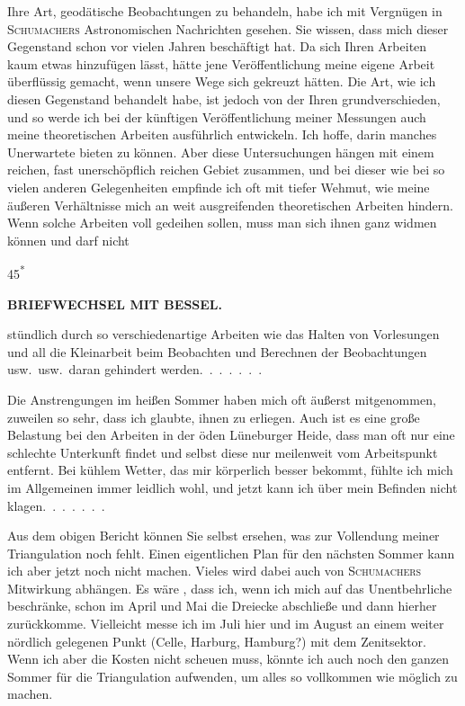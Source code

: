 \par\noindent\hspace*{\parindent}Ihre Art, geodätische Beobachtungen zu behandeln, habe ich mit Vergnügen in \textsc{Schumachers} Astronomischen Nachrichten gesehen.
Sie wissen, dass mich dieser Gegenstand schon vor vielen Jahren beschäftigt hat.
Da sich Ihren Arbeiten kaum etwas hinzufügen lässt, hätte jene Veröffentlichung meine eigene Arbeit überflüssig gemacht, wenn unsere Wege sich gekreuzt hätten.
Die Art, wie ich diesen Gegenstand behandelt habe, ist jedoch von der Ihren grundverschieden, und so werde ich bei der künftigen Veröffentlichung meiner Messungen auch meine theoretischen Arbeiten ausführlich entwickeln.
Ich hoffe, darin manches Unerwartete bieten zu können.
Aber diese Untersuchungen hängen mit einem reichen, fast unerschöpflich reichen Gebiet zusammen, und bei dieser wie bei so vielen anderen Gelegenheiten empfinde ich oft mit tiefer Wehmut, wie meine äußeren Verhältnisse mich an weit ausgreifenden theoretischen Arbeiten hindern.
Wenn solche Arbeiten voll gedeihen sollen, muss man sich ihnen ganz widmen können und darf nicht
\par\smallskip\noindent\hfill{\footnotesize45\textsuperscript{*}}\par
\clearpage
{}\hfill{\small\textbf{BRIEFWECHSEL MIT BESSEL.}}\par\medskip
\noindent stündlich durch so verschiedenartige Arbeiten wie das Halten von Vorlesungen und all die Kleinarbeit beim Beobachten und Berechnen der Beobachtungen usw.\ usw.\ daran gehindert werden.\ .\ .\ .\ .\ .\ .

\par\noindent\hspace*{\parindent}Die Anstrengungen im heißen Sommer haben mich oft äußerst mitgenommen, zuweilen so sehr, dass ich glaubte, ihnen zu erliegen.
Auch ist es eine große Belastung bei den Arbeiten in der öden Lüneburger Heide, dass man oft nur eine schlechte Unterkunft findet und selbst diese nur meilenweit vom Arbeitspunkt entfernt.
Bei kühlem Wetter, das mir körperlich besser bekommt, fühlte ich mich im Allgemeinen immer leidlich wohl, und jetzt kann ich über mein Befinden nicht klagen.\ .\ .\ .\ .\ .\ .

\par\noindent\hspace*{\parindent}Aus dem obigen Bericht können Sie selbst ersehen, was zur Vollendung meiner Triangulation noch fehlt. Einen eigentlichen Plan für den nächsten Sommer kann ich aber jetzt noch nicht machen. Vieles wird dabei auch von \textsc{Schumachers} Mitwirkung abhängen.
Es wäre , dass ich, wenn ich mich auf das Unentbehrliche beschränke, schon im April und Mai die Dreiecke abschließe und dann hierher zurückkomme. Vielleicht messe ich im Juli hier und im August an einem weiter nördlich gelegenen Punkt (Celle, Harburg, Hamburg?) mit dem Zenitsektor.
Wenn ich aber die Kosten nicht scheuen muss, könnte ich auch noch den ganzen Sommer für die Triangulation aufwenden, um alles so vollkommen wie möglich zu machen.

